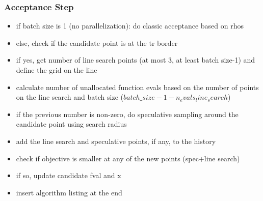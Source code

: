 \subsubsection{Acceptance Step}

\begin{itemize}
    \item if batch size is 1 (no parallelization): do classic acceptance based on rhos
    \item else, check if the candidate point is at the tr border
    \item if yes, get number of line search points (at most 3, at least batch size-1) and define the
        grid on the line
    \item calculate number of unallocated function evals based on the number of points on the line
        search and batch size ($batch\_size-1-n_evals_line_search$) 
    \item if the previous number is non-zero, do speculative sampling around the candidate point
        using search radius
    \item add the line search and speculative points, if any, to the history
    \item check if objective is smaller at any of the new points (spec+line search)
    \item if so, update candidate fval and x
    \item insert algorithm listing at the end
\end{itemize}

